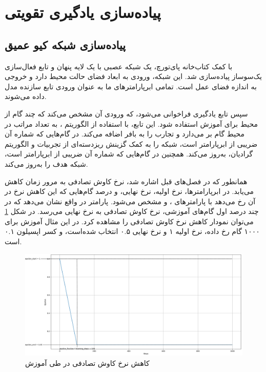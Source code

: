 \section{پیاده‌سازی یادگیری تقویتی}
\subsection{پیاده‌سازی شبکه کیو عمیق}
با کمک کتاب‌خانه پای‌تورچ،
یک شبکه عصبی با یک لایه پنهان و تابع فعال‌سازی یک‌سو‌ساز پیاده‌سازی شد.
این شبکه، ورودی به ابعاد فضای حالت محیط دارد و خروجی به اندازه فضای عمل است.
تمامی ابرپارامتر‌های ما به عنوان ورودی تابع سازنده مدل داده می‌شوند.

سپس تابع یادگیری فراخوانی می‌شود، که ورودی آن مشخص می‌کند که چند گام از محیط برای آموزش استفاده شود.
این تابع، با استفاده از الگوریتم ،
به تعداد مراتب در محیط گام بر می‌دارد و تجارب را به بافر اضافه می‌کند. در گام‌هایی که شماره آن ضریبی از ابرپارامتر  است،
شبکه را به کمک گزینش ریزدسته‌ای از تجربیات و الگوریتم گرادیان، به‌روز می‌کند.
همچنین در گام‌هایی که شماره آن ضریبی از ابرپارامتر  است،
شبکه هدف را به‌روز می‌کند.

همانطور که در فصل‌های قبل اشاره شد، نرخ کاوش تصادفی به مرور زمان کاهش می‌یابد.
در ابرپارامتر‌ها، نرخ اولیه، نرخ نهایی، و درصد گام‌هایی که این کاهش نرخ در آن رخ می‌دهد با 
پارامتر‌های ،  و  مشخص می‌شود.
پارامتر  در واقع نشان می‌دهد که در چند درصد اول گام‌های آموزشی، نرخ کاوش تصادفی به نرخ نهایی می‌رسد.
در شکل \ref{fig:epsilon_decay} می‌توان نمودار کاهش نرخ کاوش تصادفی را مشاهده کرد.
در این مثال آموزش برای ۱۰۰۰ گام رخ داده، نرخ اولیه ۱ و نرخ نهایی ۰.۵ انتخاب شده‌است، و کسر اپسیلون
 ۰.۱ است.
\begin{figure}[H]
    \centering
    \includegraphics[width=1.1\textwidth]{images/epsilon_decay_2.png}
    \caption{کاهش نرخ کاوش تصادفی در طی آموزش}\label{fig:epsilon_decay}
\end{figure}
